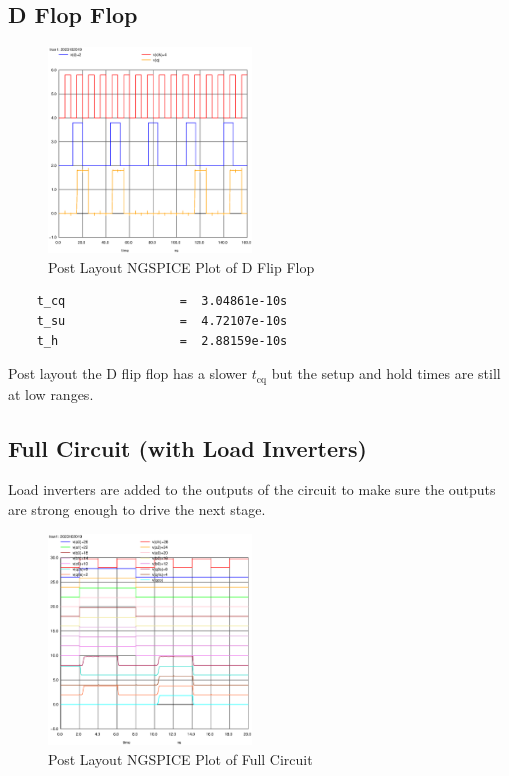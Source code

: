 \documentclass[conference]{IEEEtran}
\begin{document}
\subsection{D Flop Flop}

\begin{figure}[H]
    \centering
    \includegraphics[width=0.48\textwidth]{images/d_ff_optimized_post_tran.eps}
    \caption{Post Layout NGSPICE Plot of D Flip Flop}
\end{figure}

\begin{verbatim}
    t_cq                =  3.04861e-10s
    t_su                =  4.72107e-10s
    t_h                 =  2.88159e-10s
\end{verbatim}

Post layout the D flip flop has a slower $t_{\text{cq}}$ but the setup and hold times are still at low ranges.

\subsection{Full Circuit (with Load Inverters)}

Load inverters are added to the outputs of the circuit to make sure the outputs are strong enough to drive the next stage.

\begin{figure}[H]
    \centering
    \includegraphics[width=0.48\textwidth]{images/full_optimized_load_post_tran.eps}
    \caption{Post Layout NGSPICE Plot of Full Circuit}
\end{figure}
\end{document}
